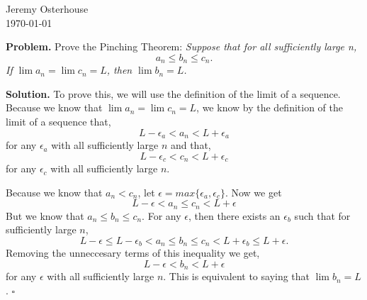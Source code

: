 \documentclass[12pt,letterpaper]{article}
\begin{document}
\begin{flushright}
\linespread{1}	%
\small \normalsize %
Jeremy Osterhouse \\
\today
\end{flushright}

{\bf Problem.} Prove the Pinching Theorem: \emph{Suppose that for all sufficiently large n,}
\[
a_n \leq b_n \leq c_n.
\]
\emph{If $\lim{a_n} = \lim{c_n} = L$, then $\lim{b_n}=L$.}

{\bf Solution.} To prove this, we will use the definition of the limit of a sequence. Because we know that $\lim{a_n} = \lim{c_n} = L$, we know by the definition of the limit of a sequence that,
\[
L-\epsilon_a < a_n < L+\epsilon_a
\]
for any $\epsilon_a$ with all sufficiently large $n$ and that,
\[
L-\epsilon_c < c_n < L+\epsilon_c
\]
for any $\epsilon_c$ with all sufficiently large $n$.

Because we know that $a_n<c_n$, let $\epsilon = max\{\epsilon_a,\epsilon_c\}$. Now we get
\[
L-\epsilon < a_n \leq c_n < L + \epsilon
\]
But we know that $a_n \leq b_n \leq c_n$. For any $\epsilon$, then there exists an $\epsilon_b$ such that for sufficiently large $n$,
\[
L-\epsilon \leq L-\epsilon_b < a_n \leq b_n \leq c_n < L+\epsilon_b \leq L+\epsilon.
\]
Removing the unneccesary terms of this inequality we get,
\[
L-\epsilon < b_n < L+\epsilon
\]
for any $\epsilon$ with all sufficiently large $n$. This is equivalent to saying that $\lim{b_n}=L$.
\hfill$\square$


\end{document}
